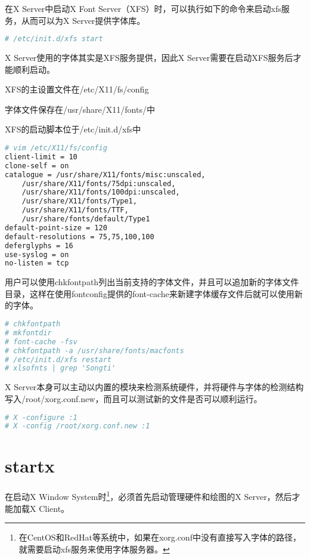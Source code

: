 在X Server中启动X Font Server（XFS）时，可以执行如下的命令来启动xfs服务，从而可以为X Server提供字体库。



\begin{lstlisting}[language=bash]
# /etc/init.d/xfs start
\end{lstlisting}

X Server使用的字体其实是XFS服务提供，因此X Server需要在启动XFS服务后才能顺利启动。

\begin{compactitem}
\item XFS的主设置文件在/etc/X11/fs/config
\item 字体文件保存在/usr/share/X11/fonts/中
\item XFS的启动脚本位于/etc/init.d/xfs中
\end{compactitem}

\begin{lstlisting}[language=bash]
# vim /etc/X11/fs/config
client-limit = 10
clone-self = on
catalogue = /usr/share/X11/fonts/misc:unscaled,
	/usr/share/X11/fonts/75dpi:unscaled,
	/usr/share/X11/fonts/100dpi:unscaled,
	/usr/share/X11/fonts/Type1,
	/usr/share/X11/fonts/TTF,
	/usr/share/fonts/default/Type1
default-point-size = 120
default-resolutions = 75,75,100,100
deferglyphs = 16
use-syslog = on
no-listen = tcp
\end{lstlisting}

用户可以使用chkfontpath列出当前支持的字体文件，并且可以追加新的字体文件目录，这样在使用fontconfig提供的font-cache来新建字体缓存文件后就可以使用新的字体。

\begin{lstlisting}[language=bash]
# chkfontpath
# mkfontdir
# font-cache -fsv
# chkfontpath -a /usr/share/fonts/macfonts
# /etc/init.d/xfs restart
# xlsofnts | grep 'Songti'
\end{lstlisting}

X Server本身可以主动以内置的模块来检测系统硬件，并将硬件与字体的检测结构写入/root/xorg.conf.new，而且可以测试新的文件是否可以顺利运行。

\begin{lstlisting}[language=bash]
# X -configure :1
# X -config /root/xorg.conf.new :1
\end{lstlisting}


\section{startx}

在启动X Window System时\footnote{在CentOS和RedHat等系统中，如果在xorg.conf中没有直接写入字体的路径，就需要启动xfs服务来使用字体服务器。}，必须首先启动管理硬件和绘图的X Server，然后才能加载X Client。

